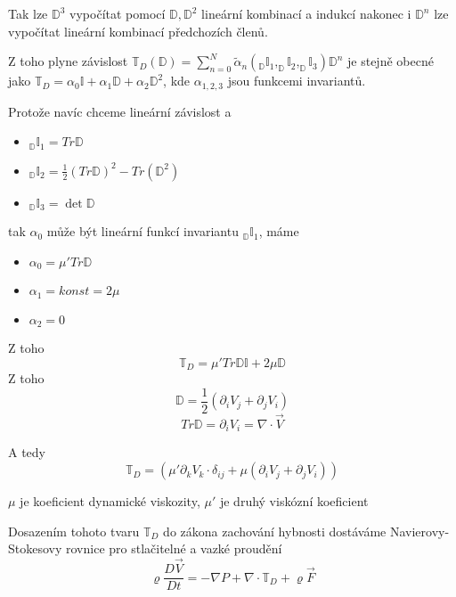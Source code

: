 \documentclass[../main.tex]{subfiles}
\begin{document}
Tak lze $\mathbb{D}^3$ vypočítat pomocí $\mathbb{D}, \mathbb{D}^2$ lineární kombinací a indukcí nakonec i $\mathbb{D}^n$ lze vypočítat lineární kombinací předchozích členů.

Z toho plyne závislost $\mathbb{T}_D (\mathbb{D}) = \sum_{n=0}^N \tilde{\alpha}_n (_\mathbb{D} \mathbb{I}_1, _\mathbb{D} \mathbb{I}_2, _\mathbb{D} \mathbb{I}_3) \mathbb{D}^n$
je stejně  obecné jako $\mathbb{T}_D = \alpha_0 \mathbb{I} + \alpha_1 \mathbb{D} + \alpha_2 \mathbb{D}^2$, kde $\alpha_{1,2,3}$ jsou funkcemi invariantů.


Protože navíc chceme lineární závislost a 
\begin{itemize}
    \item $_\mathbb{D} \mathbb{I}_1 = Tr \mathbb{D}$
    \item $_\mathbb{D} \mathbb{I}_2 = \frac{1}{2} (Tr \mathbb{D})^2 - Tr(\mathbb{D}^2)$
    \item $_\mathbb{D} \mathbb{I}_3 = \det \mathbb{D}$
\end{itemize}

tak $\alpha_0$ může být lineární funkcí invariantu $_\mathbb{D} \mathbb{I}_1$, máme
\begin{itemize}
    \item $\alpha_0 = \mu ' Tr \mathbb{D}$
    \item $\alpha_1 = konst = 2\mu$
    \item $\alpha_2 = 0$
\end{itemize}

Z toho \begin{equation}
    \mathbb{T}_D = \mu' Tr \mathbb{D} \mathbb{I} + 2 \mu \mathbb{D}
\end{equation}
Z toho
\begin{equation}
    \mathbb{D} = \frac{1}{2}(\partial_i V_j + \partial_j V_i)
\end{equation}
\begin{equation}
    Tr \mathbb{D} = \partial_i V_i = \nabla\cdot \vec{V}
\end{equation}


A tedy \begin{equation}
    \mathbb{T}_D  = \left( \mu' \partial_k V_k \cdot \delta_{ij} + \mu (\partial_i V_j + \partial_j V_i)      \right)
\end{equation}

$\mu$ je koeficient dynamické viskozity, $\mu'$ je druhý viskózní koeficient



Dosazením tohoto tvaru $\mathbb{T}_D$ do zákona zachování hybnosti dostáváme Navierovy-Stokesovy rovnice pro stlačitelné a vazké proudění 
\begin{equation}
    \varrho\frac{D\vec{V}}{Dt} = - \nabla P + \nabla \cdot \mathbb{T}_D + \varrho \vec{F}
 \end{equation}
\end{document}
